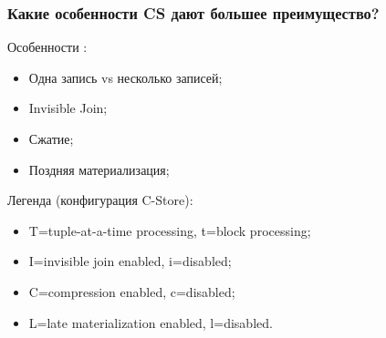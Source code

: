 \documentclass{beamer}
\begin{document}
\begin{frame}
\frametitle{Какие особенности CS дают большее преимущество?}

Особенности \cite{Abadi2008}:
\begin{itemize}
  \setlength\itemsep{1em}
  \item Одна запись vs несколько записей;
  \item Invisible Join;
  \item Сжатие;
  \item Поздняя материализация;
\end{itemize}


Легенда (конфигурация C-Store):
\begin{itemize}
  \item T=tuple-at-a-time processing, t=block processing;
  \item I=invisible join enabled, i=disabled;
  \item C=compression enabled, c=disabled;
  \item L=late materialization enabled, l=disabled. 
\end{itemize}

\end{frame}
\end{document}
